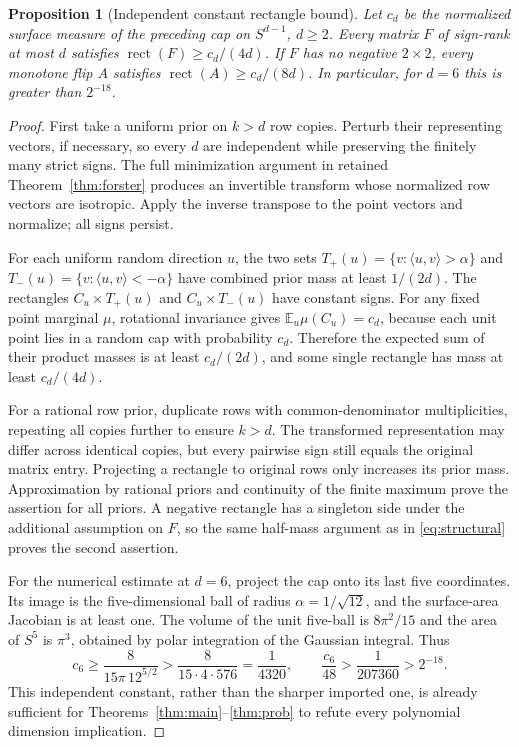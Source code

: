 \documentclass[11pt]{article}
\newtheorem{proposition}[theorem]{Proposition}
\DeclareMathOperator{\rect}{rect}
\newcommand{\E}{\mathbb E}
\newcommand{\1}{\mathbf 1}
\begin{document}
\begin{proposition}[Independent constant rectangle bound]\label{prop:cap-bound}
Let $c_d$ be the normalized surface measure of the preceding cap on $S^{d-1}$, $d\ge2$. Every matrix $F$ of sign-rank at most $d$ satisfies $\rect(F)\ge c_d/(4d)$. If $F$ has no negative $2\times2$, every monotone flip $A$ satisfies $\rect(A)\ge c_d/(8d)$. In particular, for $d=6$ this is greater than $2^{-18}$.
\end{proposition}
\begin{proof}
First take a uniform prior on $k>d$ row copies. Perturb their representing vectors, if necessary, so every $d$ are independent while preserving the finitely many strict signs. The full minimization argument in retained Theorem~\ref{thm:forster} produces an invertible transform whose normalized row vectors are isotropic. Apply the inverse transpose to the point vectors and normalize; all signs persist.

For each uniform random direction $u$, the two sets $T_+(u)=\{v:\langle u,v\rangle>\alpha\}$ and $T_-(u)=\{v:\langle u,v\rangle<-\alpha\}$ have combined prior mass at least $1/(2d)$. The rectangles $C_u\times T_+(u)$ and $C_u\times T_-(u)$ have constant signs. For any fixed point marginal $\mu$, rotational invariance gives $\E_u\mu(C_u)=c_d$, because each unit point lies in a random cap with probability $c_d$. Therefore the expected sum of their product masses is at least $c_d/(2d)$, and some single rectangle has mass at least $c_d/(4d)$.

For a rational row prior, duplicate rows with common-denominator multiplicities, repeating all copies further to ensure $k>d$. The transformed representation may differ across identical copies, but every pairwise sign still equals the original matrix entry. Projecting a rectangle to original rows only increases its prior mass. Approximation by rational priors and continuity of the finite maximum prove the assertion for all priors. A negative rectangle has a singleton side under the additional assumption on $F$, so the same half-mass argument as in \eqref{eq:structural} proves the second assertion.

For the numerical estimate at $d=6$, project the cap onto its last five coordinates. Its image is the five-dimensional ball of radius $\alpha=1/\sqrt{12}$, and the surface-area Jacobian is at least one. The volume of the unit five-ball is $8\pi^2/15$ and the area of $S^5$ is $\pi^3$, obtained by polar integration of the Gaussian integral. Thus
\[
 c_6\ge\frac8{15\pi\,12^{5/2}}>
 \frac8{15\cdot4\cdot576}=\frac1{4320},
 \qquad \frac{c_6}{48}>\frac1{207360}>2^{-18}.
\]
This independent constant, rather than the sharper imported one, is already sufficient for Theorems~\ref{thm:main}--\ref{thm:prob} to refute every polynomial dimension implication.
\end{proof}
\end{document}
